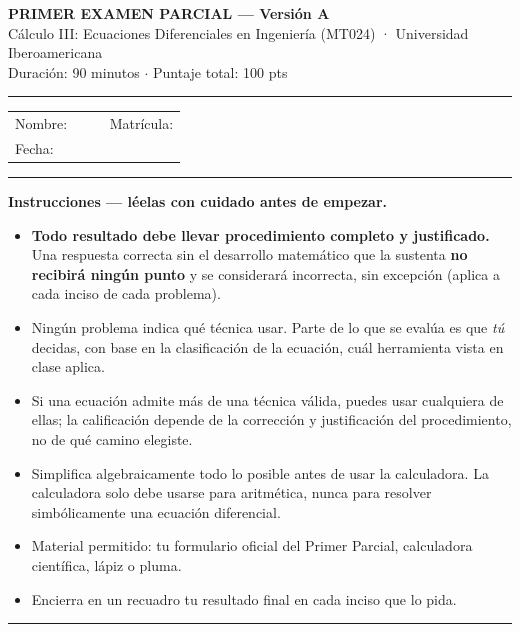 \documentclass[11pt,letterpaper]{article}
\newenvironment{aviso}{%
  \par\vspace{2pt}\hrule\vspace{6pt}
}{%
  \par\vspace{6pt}\hrule\vspace{2pt}
}
\begin{document}
\begin{center}
{\Large\bfseries PRIMER EXAMEN PARCIAL --- Versión A}\\[2pt]
{\small Cálculo III: Ecuaciones Diferenciales en Ingeniería (MT024) · Universidad Iberoamericana}\\[1pt]
{\small Duración: 90 minutos \; $\cdot$ \; Puntaje total: 100 pts}
\end{center}

\vspace{4pt}\hrule\vspace{10pt}

\noindent
\begin{tabular}{@{}p{0.55\linewidth}p{0.45\linewidth}@{}}
Nombre: \dotfill & Matrícula: \dotfill \\[10pt]
Fecha: \dotfill & \\[10pt]
\end{tabular}

\vspace{6pt}

\begin{aviso}
\textbf{Instrucciones — léelas con cuidado antes de empezar.}
\begin{itemize}[leftmargin=1.4em, itemsep=2pt, topsep=4pt]
  \item \textbf{Todo resultado debe llevar procedimiento completo y justificado.} Una respuesta correcta sin el desarrollo matemático que la sustenta \textbf{no recibirá ningún punto} y se considerará incorrecta, sin excepción (aplica a cada inciso de cada problema).
  \item Ningún problema indica qué técnica usar. Parte de lo que se evalúa es que \emph{tú} decidas, con base en la clasificación de la ecuación, cuál herramienta vista en clase aplica.
  \item Si una ecuación admite más de una técnica válida, puedes usar cualquiera de ellas; la calificación depende de la corrección y justificación del procedimiento, no de qué camino elegiste.
  \item Simplifica algebraicamente todo lo posible antes de usar la calculadora. La calculadora solo debe usarse para aritmética, nunca para resolver simbólicamente una ecuación diferencial.
  \item Material permitido: tu formulario oficial del Primer Parcial, calculadora científica, lápiz o pluma.
  \item Encierra en un recuadro tu resultado final en cada inciso que lo pida.
\end{itemize}
\end{aviso}
\end{document}
